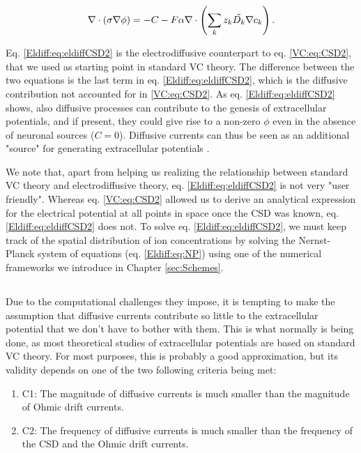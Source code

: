 \begin{equation}
\nabla \cdot (\sigma\nabla\phi) = - C - F\alpha \nabla \cdot \left (\sum_k{z_k \tilde{D_k}{\bf \nabla} c_{k}} \right).
\label{Eldiff:eq:eldiffCSD2}
\end{equation}

Eq. \ref{Eldiff:eq:eldiffCSD2} is the electrodiffusive counterpart to eq. \ref{VC:eq:CSD2}, that we used as starting point in standard VC theory. The difference between the two equations is the last term in eq. \ref{Eldiff:eq:eldiffCSD2}, which is the diffusive contribution not accounted for in \ref{VC:eq:CSD2}. As eq. \ref{Eldiff:eq:eldiffCSD2} shows, also diffusive processes can contribute to the genesis of extracellular potentials, and if present, they could give rise to a non-zero $\phi$ even in the absence of neuronal sources ($C = 0$). Diffusive currents can thus be seen as an additional "source" for generating extracellular potentials \citep{Halnes2017}. 

We note that, apart from helping us realizing the relationship between standard VC theory and electrodiffusive theory, eq. \ref{Eldiff:eq:eldiffCSD2} is not very "user friendly". Whereas eq. \ref{VC:eq:CSD2} allowed us to derive an analytical expression for the electrical potential at all points in space once the CSD was known, eq. \ref{Eldiff:eq:eldiffCSD2} does not. To solve  eq. \ref{Eldiff:eq:eldiffCSD2}, we must keep track of the spatial distribution of ion concentrations by solving the Nernst-Planck system of equations (eq. \ref{Eldiff:eq:NP}) using one of the numerical frameworks we introduce in Chapter \ref{sec:Schemes}. 


\subsection{}
\label{sec:Eldiff:estimates}
Due to the computational challenges they impose, it is tempting to make the assumption that diffusive currents contribute so little to the extracellular potential that we don't have to bother with them. This is what normally is being done, as most theoretical studies of extracellular potentials are based on standard VC theory. For most purposes, this is probably a good approximation, but its validity depends on one of the two following criteria being met:

\begin{enumerate}
\item C1: The magnitude of diffusive currents is much smaller than the magnitude of Ohmic drift currents.
\item C2: The frequency of diffusive currents is much smaller than the frequency of the CSD and the Ohmic drift currents. 
\end{enumerate}


